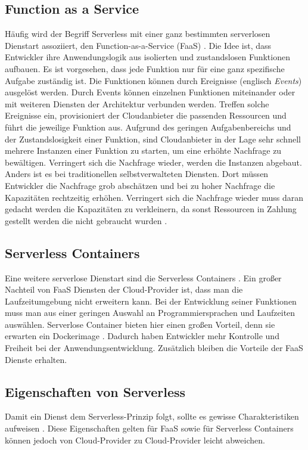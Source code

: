 \subsection{Function as a Service}
Häufig wird der Begriff Serverless mit einer ganz bestimmten serverlosen Dienstart
assoziiert, den Function-as-a-Service (FaaS) \cite{ServerlessTrends}.
Die Idee ist, dass Entwickler ihre Anwendungslogik aus isolierten und 
zustandslosen Funktionen aufbauen.
Es ist vorgesehen, dass jede Funktion nur für eine
ganz spezifische Aufgabe zuständig ist. Die Funktionen können
durch Ereignisse (englisch \emph{Events}) ausgelöst werden.
Durch Events können einzelnen Funktionen miteinander oder mit
weiteren Diensten der Architektur verbunden werden. 
Treffen solche Ereignisse ein, provisioniert der
Cloudanbieter die passenden Ressourcen und führt die jeweilige Funktion aus.
Aufgrund des geringen Aufgabenbereichs und der Zustandslosigkeit einer Funktion,
sind Cloudanbieter in der Lage sehr schnell mehrere Instanzen einer Funktion zu starten,
um eine erhöhte Nachfrage zu bewältigen.
Verringert sich die Nachfrage wieder, werden die Instanzen abgebaut. Anders ist 
es bei traditionellen selbstverwalteten Diensten. Dort müssen Entwickler die Nachfrage grob
abschätzen und bei zu hoher Nachfrage die Kapazitäten rechtzeitig
erhöhen. Verringert sich die Nachfrage wieder muss daran
gedacht werden die Kapazitäten zu verkleinern, da sonst
Ressourcen in Zahlung gestellt werden die nicht gebraucht wurden
\cite{WhatIsServerless} \cite{ServerlessTrends}.

\subsection{Serverless Containers}
Eine weitere serverlose Dienstart sind die Serverless Containers \cite{ServerlessContainers}.
Ein großer Nachteil von FaaS Diensten der Cloud-Provider ist,
dass man die Laufzeitumgebung nicht erweitern kann. Bei der
Entwicklung seiner Funktionen muss man aus einer geringen Auswahl
an Programmiersprachen und Laufzeiten auswählen. Serverlose Container
bieten hier einen großen Vorteil, denn sie erwarten ein Dockerimage \cite{ServerlessContainers}.
Dadurch haben Entwickler mehr Kontrolle und Freiheit bei der
Anwendungsentwicklung. Zusätzlich bleiben 
die Vorteile der FaaS Dienste erhalten.

\subsection{Eigenschaften von Serverless}
Damit ein Dienst dem Serverless-Prinzip folgt, sollte es
gewisse Charakteristiken aufweisen \cite{ShafKhonMou}. Diese Eigenschaften gelten
für FaaS sowie für Serverless Containers können jedoch von Cloud-Provider zu
Cloud-Provider leicht abweichen.


